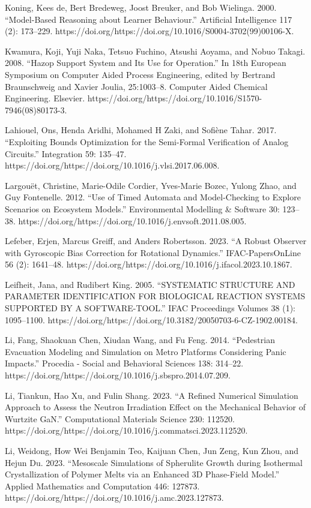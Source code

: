 \documentclass[utf8]{gradu3}
\begin{document}
Koning, Kees de, Bert Bredeweg, Joost Breuker, and Bob Wielinga. 2000. “Model-Based Reasoning about Learner Behaviour.” Artificial Intelligence 117 (2): 173–229. https://doi.org/https://doi.org/10.1016/S0004-3702(99)00106-X.

Kwamura, Koji, Yuji Naka, Tetsuo Fuchino, Atsushi Aoyama, and Nobuo Takagi. 2008. “Hazop Support System and Its Use for Operation.” In 18th European Symposium on Computer Aided Process Engineering, edited by Bertrand Braunschweig and Xavier Joulia, 25:1003–8. Computer Aided Chemical Engineering. Elsevier. https://doi.org/https://doi.org/10.1016/S1570-7946(08)80173-3.

Lahiouel, Ons, Henda Aridhi, Mohamed H Zaki, and Sofiène Tahar. 2017. “Exploiting Bounds Optimization for the Semi-Formal Verification of Analog Circuits.” Integration 59: 135–47. https://doi.org/https://doi.org/10.1016/j.vlsi.2017.06.008.

Largouët, Christine, Marie-Odile Cordier, Yves-Marie Bozec, Yulong Zhao, and Guy Fontenelle. 2012. “Use of Timed Automata and Model-Checking to Explore Scenarios on Ecosystem Models.” Environmental Modelling \& Software 30: 123–38. https://doi.org/https://doi.org/10.1016/j.envsoft.2011.08.005.

Lefeber, Erjen, Marcus Greiff, and Anders Robertsson. 2023. “A Robust Observer with Gyroscopic Bias Correction for Rotational Dynamics.” IFAC-PapersOnLine 56 (2): 1641–48. https://doi.org/https://doi.org/10.1016/j.ifacol.2023.10.1867.

Leifheit, Jana, and Rudibert King. 2005. “SYSTEMATIC STRUCTURE AND PARAMETER IDENTIFICATION FOR BIOLOGICAL REACTION SYSTEMS SUPPORTED BY A SOFTWARE-TOOL.” IFAC Proceedings Volumes 38 (1): 1095–1100. https://doi.org/https://doi.org/10.3182/20050703-6-CZ-1902.00184.

Li, Fang, Shaokuan Chen, Xiudan Wang, and Fu Feng. 2014. “Pedestrian Evacuation Modeling and Simulation on Metro Platforms Considering Panic Impacts.” Procedia - Social and Behavioral Sciences 138: 314–22. https://doi.org/https://doi.org/10.1016/j.sbspro.2014.07.209.

Li, Tiankun, Hao Xu, and Fulin Shang. 2023. “A Refined Numerical Simulation Approach to Assess the Neutron Irradiation Effect on the Mechanical Behavior of Wurtzite GaN.” Computational Materials Science 230: 112520. https://doi.org/https://doi.org/10.1016/j.commatsci.2023.112520.

Li, Weidong, How Wei Benjamin Teo, Kaijuan Chen, Jun Zeng, Kun Zhou, and Hejun Du. 2023. “Mesoscale Simulations of Spherulite Growth during Isothermal Crystallization of Polymer Melts via an Enhanced 3D Phase-Field Model.” Applied Mathematics and Computation 446: 127873. https://doi.org/https://doi.org/10.1016/j.amc.2023.127873.
\end{document}
